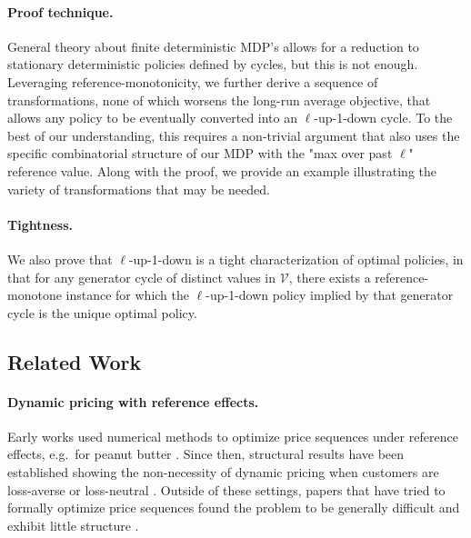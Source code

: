 \documentclass[format=acmsmall, review=false]{acmart}
\newcommand{\luid}{$\ell$-up-1-down\xspace}
\newcommand{\cV}{\mathcal{V}}
\begin{document}
\paragraph{Proof technique.}
General theory about finite deterministic MDP's allows for a reduction to stationary deterministic policies defined by cycles, but this is not enough.
Leveraging reference-monotonicity, we further derive a sequence of transformations, none of which worsens the long-run average objective, that allows any policy to be eventually converted into an \luid cycle.
To the best of our understanding, this requires a non-trivial argument that also uses the specific combinatorial structure of our MDP with the "max over past $\ell$" reference value.  Along with the proof, we provide an example illustrating the variety of transformations that may be needed.

\paragraph{Tightness.}
We also prove that \luid is a tight characterization of optimal policies, in that for any generator cycle of distinct values in $\cV$, there exists a reference-monotone instance for which the \luid policy implied by that generator cycle is the unique optimal policy.



\subsection{Related Work} \label{sec:relatedWork}

\paragraph{Dynamic pricing with reference effects.}
Early works used numerical methods to optimize price sequences under reference effects, e.g.\ for peanut butter \citep{greenleaf1995impact}.
Since then, structural results have been established showing the non-necessity of dynamic pricing when customers are loss-averse or loss-neutral \citep{popescu2007dynamic,nasiry2011dynamic}.
Outside of these settings, papers that have tried to formally optimize price sequences found the problem to be generally difficult and exhibit little structure \citep{fibich2003explicit,hu2016dynamic,chen2017efficient}.
\end{document}
